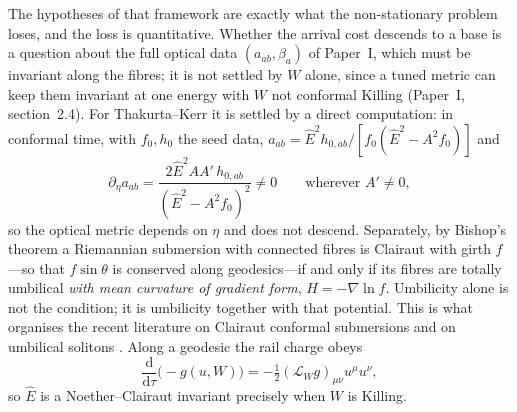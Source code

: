 \documentclass[12pt]{iopart}
\theoremstyle{plain}
\theoremstyle{definition}
\theoremstyle{remark}
\newcommand{\Ehat}{\hat E}
\newcommand{\dd}{\mathrm{d}}
\begin{document}
The hypotheses of that framework are exactly what the non-stationary problem
loses, and the loss is quantitative. Whether the arrival cost descends to a base is a
question about the full optical data $(a_{ab},\beta_a)$ of Paper~I, which must be
invariant along the fibres; it is not settled by $W$ alone, since a tuned metric can keep
them invariant at one energy with $W$ not conformal Killing (Paper~I,
section~2.4). For Thakurta--Kerr it is settled by a direct computation: in conformal
time, with $f_0,h_0$ the seed data, $a_{ab}=\Ehat^2h_{0,ab}/[f_0(\Ehat^2-A^2f_0)]$ and
\begin{equation}
    \partial_\eta a_{ab}=\frac{2\Ehat^2AA'\,h_{0,ab}}{(\Ehat^2-A^2f_0)^2}\neq0
    \qquad\text{wherever }A'\neq0 ,
    \label{eq:aT-running}
\end{equation}
so the optical metric depends on $\eta$ and does not descend. Separately, by Bishop's theorem
\cite{Bishop1972} a Riemannian submersion with connected fibres is Clairaut with girth
$f$---so that $f\sin\theta$ is conserved along geodesics---if and only if its
fibres are totally umbilical \emph{with mean curvature of gradient form},
$H=-\nabla\ln f$. Umbilicity alone is not the
condition; it is umbilicity together with that potential. This is what organises
the recent literature on Clairaut conformal submersions and on umbilical solitons
\cite{MeenaZawadzki2024,Lecian2026Yamabe,Lecian2026Solitons}.
Along a geodesic the rail charge obeys
\begin{equation}
    \frac{\dd}{\dd\tau}\big(\!-\!g(u,W)\big)
      =-\tfrac12(\mathcal L_Wg)_{\mu\nu}u^\mu u^\nu ,
    \label{eq:rail-drift}
\end{equation}
so $\Ehat$ is a Noether--Clairaut invariant precisely when $W$ is Killing.
\end{document}
